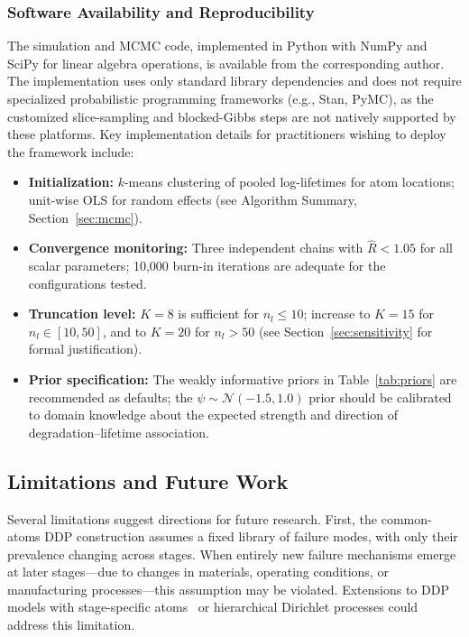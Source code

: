 \documentclass[a4paper,fleqn,longmktitle]{cas-sc}
\begin{document}
\subsubsection{Software Availability and Reproducibility}

The simulation and MCMC code, implemented in Python with NumPy and SciPy for linear algebra operations, is available from the corresponding author. The implementation uses only standard library dependencies and does not require specialized probabilistic programming frameworks (e.g., Stan, PyMC), as the customized slice-sampling and blocked-Gibbs steps are not natively supported by these platforms. Key implementation details for practitioners wishing to deploy the framework include:

\begin{itemize}
    \item \textbf{Initialization:} $k$-means clustering of pooled log-lifetimes for atom locations; unit-wise OLS for random effects (see Algorithm Summary, Section~\ref{sec:mcmc}).
    \item \textbf{Convergence monitoring:} Three independent chains with $\widehat{R} < 1.05$ for all scalar parameters; 10,000 burn-in iterations are adequate for the configurations tested.
    \item \textbf{Truncation level:} $K=8$ is sufficient for $n_l \leq 10$; increase to $K=15$ for $n_l \in [10, 50]$, and to $K=20$ for $n_l > 50$ (see Section~\ref{sec:sensitivity} for formal justification).
    \item \textbf{Prior specification:} The weakly informative priors in Table~\ref{tab:priors} are recommended as defaults; the $\psi \sim \mathcal{N}(-1.5, 1.0)$ prior should be calibrated to domain knowledge about the expected strength and direction of degradation--lifetime association.
\end{itemize}

\subsection{Limitations and Future Work}

Several limitations suggest directions for future research. First, the common-atoms DDP construction assumes a fixed library of failure modes, with only their prevalence changing across stages. When entirely new failure mechanisms emerge at later stages---due to changes in materials, operating conditions, or manufacturing processes---this assumption may be violated. Extensions to DDP models with stage-specific atoms~\cite{Carvajal2023} or hierarchical Dirichlet processes could address this limitation.
\end{document}
